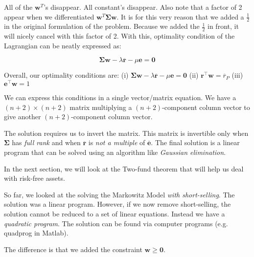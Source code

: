 All of the $\bm{w}^{T}$'s disappear. All constant's disappear. 
Also note that a factor of 2 appear when we differentiated $\bm{w}^T\bm{\Sigma}\bm{w}$. 
It is for this very reason that we added a $\frac{1}{2}$ in the original formulation of the problem.
Because we added the $\frac{1}{2}$ in front, it will nicely cancel with this 
factor of 2. With this, optimality condition of the Lagrangian can be neatly expressed as:

$$
\bm{\Sigma}\bm{w} - \lambda \overline{\bm{r}} - \mu \bm{e} = \bm{0}
$$

Overall, our optimality conditions are: 
(i) $\bm{\Sigma}\bm{w} - \lambda \overline{\bm{r}} - \mu \bm{e} = \bm{0}$
(ii) $\bm{r}^{\top}\bm{w} = \overline{r}_P$
(iii) $\bm{e}^{\top}\bm{w} = 1$

We can express this conditions in a single vector/matrix equation.
We have a $(n+2) \times (n+2)$ matrix multiplying a $(n+2)$-component column vector 
to give another $(n+2)$-component column vector. 

The solution requires us to invert the matrix. 
This matrix is invertible only when $\bm{\Sigma}$ has \textit{full rank}
and when $\overline{\bm{r}}$ is \textit{not a multiple} of $\overline{\bm{e}}$. 
The final solution is a linear program that can be solved using an algorithm like
\textit{Gaussian elimination}. 


In the next section, we will look at the Two-fund theorem that will 
help us deal with risk-free assets.


\frmrule

\begin{example}

\end{example}

\frmrule

So far, we looked at the solving the Markowitz Model \textit{with short-selling}. 
The solution was a linear program. However, if we now remove short-selling, 
the solution cannot be reduced to a set of linear equations. 
Instead we have a \textit{quadratic program}. The solution 
can be found via computer programs (e.g. quadprog in Matlab). 

The difference is that we added the constraint $\bm{w} \geqslant \bm{0}$. 

\frmrule

